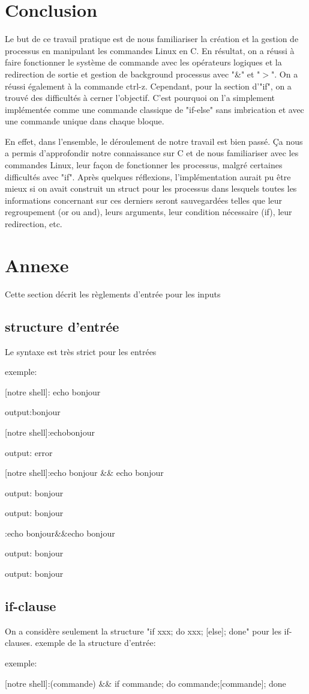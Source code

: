 \documentclass{article}
\begin{document}
\section{Conclusion}
Le but de ce travail pratique est de nous familiariser la création et la gestion de processus en manipulant les commandes Linux en C. En résultat, on a réussi à faire fonctionner le système de commande avec les opérateurs logiques et la redirection de sortie et gestion de background processus avec "\&" et "$>$". On a réussi également à la commande ctrl-z. Cependant, pour la section d'"if", on a trouvé des difficultés à cerner l'objectif. C'est pourquoi on l'a simplement implémentée comme une commande classique de "if-else" sans imbrication et avec une commande unique dans chaque bloque. 


En effet, dans l'ensemble, le déroulement de notre travail est bien passé. Ça nous a permis d'approfondir notre connaissance sur C et de nous familiariser avec les commandes Linux, leur façon de fonctionner les processus, malgré certaines difficultés avec "if". Après quelques réflexions, l'implémentation aurait pu être mieux si on avait construit un struct pour les processus dans lesquels toutes les informations concernant sur ces derniers seront sauvegardées telles que leur regroupement (or ou and), leurs arguments, leur condition nécessaire (if),  leur redirection, etc.

\section{Annexe}
Cette section décrit les règlements d'entrée pour les inputs
\subsection{structure d'entrée}

    Le syntaxe est très strict pour les entrées
    
    
    exemple:
    
   [notre shell]: echo bonjour
   
    output:bonjour

\bigskip

[notre shell]:echobonjour

output: error

\bigskip

[notre shell]:echo bonjour \&\& echo bonjour

output: bonjour

output: bonjour

:echo bonjour\&\&echo bonjour

output: bonjour

output: bonjour


\subsection{if-clause}
    On a considère seulement la structure "if xxx; do xxx; [else]; done" pour les if-clauses. exemple de la structure d'entrée:
    
exemple:

[notre shell]:(commande) \&\& if commande; do commande;[commande]; done
\end{document}
